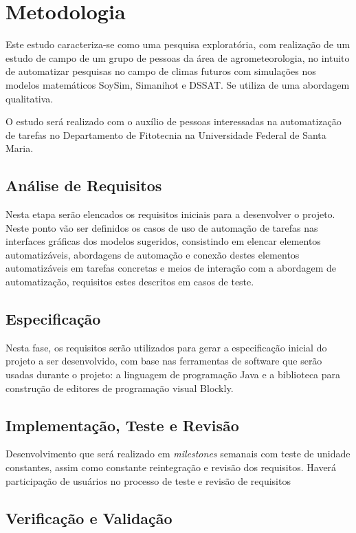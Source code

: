 \documentclass[12pt]{article}
\begin{document}
	\section{Metodologia}

	Este estudo caracteriza-se como uma pesquisa exploratória, com realização de um estudo de campo de um grupo de pessoas da área de agrometeorologia, no intuito de automatizar pesquisas no campo de climas futuros com simulações nos modelos matemáticos SoySim, Simanihot e DSSAT. Se utiliza de uma abordagem qualitativa.

	O estudo será realizado com o auxílio de pessoas interessadas na automatização de tarefas no Departamento de Fitotecnia na Universidade Federal de Santa Maria.

	\subsection{Análise de Requisitos}

	 Nesta etapa serão elencados os requisitos iniciais para a desenvolver o projeto. Neste ponto vão ser definidos os casos de uso de automação de tarefas nas interfaces gráficas dos modelos sugeridos, consistindo em elencar elementos automatizáveis, abordagens de automação e conexão destes elementos automatizáveis em tarefas concretas e meios de interação com a abordagem de automatização, requisitos estes descritos em casos de teste.

	\subsection{Especificação}
	Nesta fase, os requisitos serão utilizados para gerar a especificação inicial do projeto a ser desenvolvido, com base nas ferramentas de software que serão usadas durante o projeto: a linguagem de programação Java e a biblioteca para construção de editores de programação visual Blockly.


	\subsection{Implementação, Teste e Revisão}

	Desenvolvimento que será realizado em \emph{milestones} semanais com teste de unidade constantes, assim como constante reintegração e revisão dos requisitos. Haverá participação de usuários no processo de teste e revisão de requisitos


    \subsection{Verificação e Validação}
\end{document}
